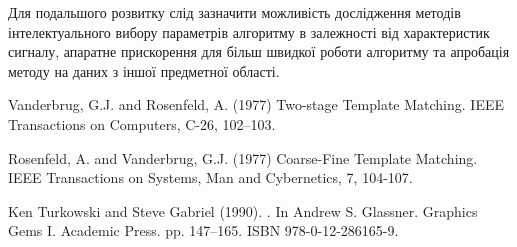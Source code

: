 \documentclass{thesis_utf8}
\begin{document}
Для подальшого розвитку слід зазначити можливість дослідження методів інтелектуального вибору параметрів алгоритму в
залежності від характеристик сигналу, апаратне прискорення для більш швидкої роботи алгоритму та апробація методу на
даних з іншої предметної області.

\begin{thebibliography}
    Vanderbrug, G.J. and Rosenfeld, A. (1977) Two-stage Template Matching. IEEE Transactions on Computers, C-26, 102--103.

    Rosenfeld, A. and Vanderbrug, G.J. (1977) Coarse-Fine Template Matching. IEEE Transactions on Systems, Man and Cybernetics, 7, 104-107.

    Ken Turkowski and Steve Gabriel (1990). . In Andrew S. Glassner. Graphics
    Gems I. Academic Press. pp. 147–165. ISBN 978-0-12-286165-9.
\end{thebibliography}








\end{document}
